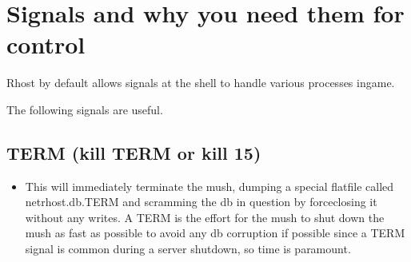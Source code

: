 \documentclass[letterpaper,10pt,english]{sphinxmanual}
\begin{document}
\begin{sphinxVerbatim}[commandchars=\\\{\}]
            
             
             
            
       

          
           
 

\end{sphinxVerbatim}


\section{Signals and why you need them for control}
\label{\detokenize{maintenance:signals-and-why-you-need-them-for-control}}
\sphinxAtStartPar
Rhost by default allows signals at the shell to handle various processes in\sphinxhyphen{}game.

\sphinxAtStartPar
The following signals are useful.


\subsection{TERM (kill \sphinxhyphen{}TERM or kill \sphinxhyphen{}15)}
\label{\detokenize{maintenance:term-kill-term-or-kill-15}}\begin{itemize}
\item {} 
\sphinxAtStartPar
This will immediately terminate the mush, dumping a special flatfile called
netrhost.db.TERM and scramming the db in question by force\sphinxhyphen{}closing it
without any writes.  A TERM is the effort for the mush to shut down the
mush as fast as possible to avoid any db corruption if possible since
a TERM signal is common during a server shutdown, so time is paramount.

\end{itemize}
\end{document}
